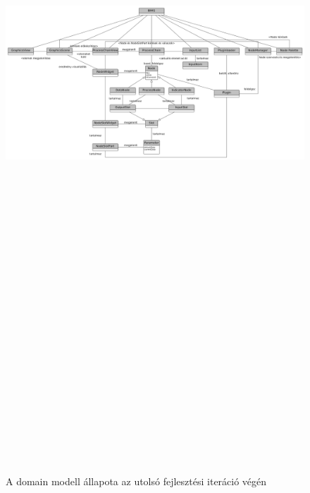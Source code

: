 \documentclass[a4paper,12pt,oneside]{report}
\begin{document}
\begin{landscape}
\begin{figure}[h]
  \includegraphics[width=26cm,height=30cm,keepaspectratio]{domain_gray.png}
  \caption{A domain modell állapota az utolsó fejlesztési iteráció végén }

  \label{fig:bimg_domain_img}
\end{figure}
\end{landscape}
\end{document}
